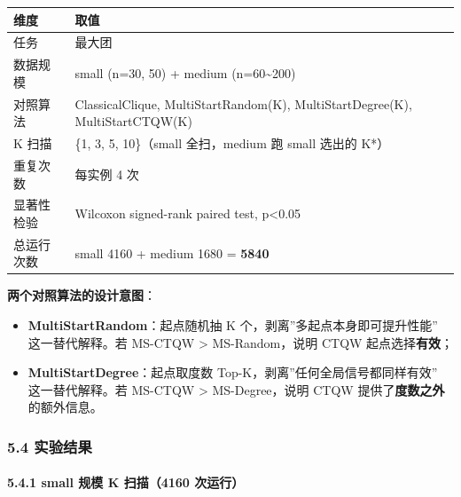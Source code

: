 \documentclass[
  11pt,
]{ctexart}
\newcounter{none} %
\providecommand{\tightlist}{%
  \setlength{\itemsep}{0pt}\setlength{\parskip}{0pt}}
\begin{document}
{\def\LTcaptype{none} %
\begin{longtable}[]{@{}
  >{\raggedright\arraybackslash}p{}
  >{\raggedright\arraybackslash}p{}@{}}
\toprule\noalign{}
\begin{minipage}[b]{\linewidth}\raggedright
维度
\end{minipage} & \begin{minipage}[b]{\linewidth}\raggedright
取值
\end{minipage} \\
\midrule\noalign{}
\endhead
\bottomrule\noalign{}
\endlastfoot
任务 & 最大团 \\
数据规模 & small (n=30, 50) + medium (n=60\textasciitilde200) \\
对照算法 & ClassicalClique, MultiStartRandom(K), MultiStartDegree(K),
MultiStartCTQW(K) \\
K 扫描 & \{1, 3, 5, 10\}（small 全扫，medium 跑 small 选出的 K*） \\
重复次数 & 每实例 4 次 \\
显著性检验 & Wilcoxon signed-rank paired test, p\textless0.05 \\
总运行次数 & small 4160 + medium 1680 = \textbf{5840} \\
\end{longtable}
}

\textbf{两个对照算法的设计意图}：

\begin{itemize}
\tightlist
\item
  \textbf{MultiStartRandom}：起点随机抽 K
  个，剥离''多起点本身即可提升性能'' 这一替代解释。若 MS-CTQW
  \textgreater{} MS-Random，说明 CTQW 起点选择\textbf{有效}；
\item
  \textbf{MultiStartDegree}：起点取度数
  Top-K，剥离''任何全局信号都同样有效'' 这一替代解释。若 MS-CTQW
  \textgreater{} MS-Degree，说明 CTQW 提供了\textbf{度数之外}
  的额外信息。
\end{itemize}

\subsubsection{5.4 实验结果}\label{ux5b9eux9a8cux7ed3ux679c-2}

\paragraph{5.4.1 small 规模 K 扫描（4160
次运行）}\label{small-ux89c4ux6a21-k-ux626bux63cf4160-ux6b21ux8fd0ux884c}
\end{document}
